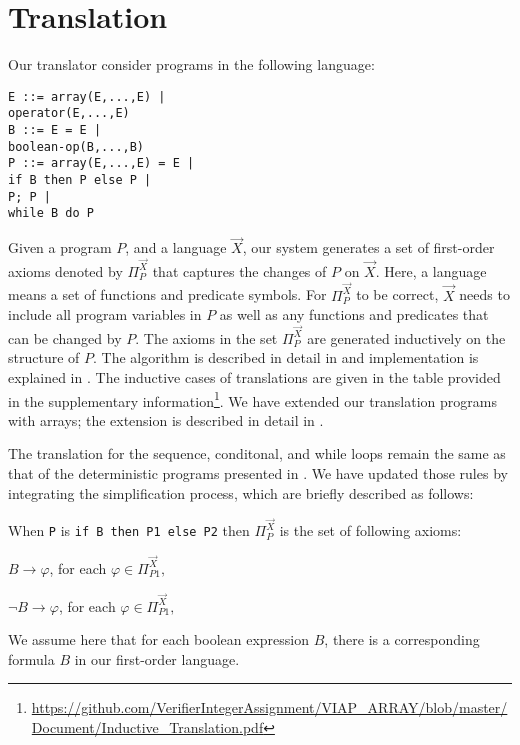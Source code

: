 \section{Translation}\label{sec:Translation}
Our translator consider programs in the following language:
\begin{verbatim}
E ::= array(E,...,E) |
operator(E,...,E)
B ::= E = E |
boolean-op(B,...,B)
P ::= array(E,...,E) = E | 
if B then P else P |
P; P |
while B do P 
\end{verbatim}

Given a program $P$, and a language $\vec{X}$, our system generates a set of first-order axioms denoted by $\Pi_P^{\vec{X}}$ that captures the changes of $P$ on $\vec{X}$. Here, a language means a set of functions and predicate symbols. For $\Pi_P^{\vec{X}}$ to be correct, $\vec{X}$ needs to include all program variables in $P$ as well as any functions and predicates that can be changed by $P$. The axioms in the set $\Pi_P^{\vec{X}}$ are generated inductively on the structure of $P$. The algorithm is described in detail in \cite{Lin20161}
and implementation is explained in 
\cite{DBLP:conf/synasc/pritom17}. The inductive cases of translations are given in the table provided in the supplementary information\footnote{\url{https://github.com/VerifierIntegerAssignment/VIAP_ARRAY/blob/master/Document/Inductive_Translation.pdf}}. We have extended our translation programs with arrays; the extension is described in detail in \cite{viap-array}.


The translation for the sequence, conditonal, and while loops remain the same as that of the deterministic programs presented in \cite{Lin20161}.  We have updated those rules by integrating the simplification process, which are briefly described as follows:


\begin{defn} \label{Rule3} When \verb-P- is \verb-if B then P1 else P2- then $\Pi_P^{\vec{X}}$ is the set of following axioms:
	
\vspace{2mm}
$B \rightarrow \varphi$, for each $\varphi \in \Pi_{P1}^{\vec{X}},$

\vspace{2mm}
$\neg B \rightarrow \varphi$, for each $\varphi \in \Pi_{P1}^{\vec{X}},$
\vspace{2mm}

We assume here that for each boolean expression $B$, there is a corresponding formula $B$ in our first-order language.
	

\end{defn}


